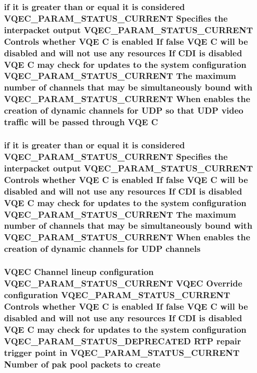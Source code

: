 \subsubsection{\setlength{\rightskip}{0pt plus 5cm}if it is greater than or equal it is considered VQEC\_\-PARAM\_\-STATUS\_\-CURRENT Specifies the interpacket output VQEC\_\-PARAM\_\-STATUS\_\-CURRENT Controls whether VQE \bf{C} is enabled If false VQE \bf{C} will be disabled and will not use any resources If CDI is disabled VQE \bf{C} may check for updates \bf{to} the system configuration VQEC\_\-PARAM\_\-STATUS\_\-CURRENT The maximum number of \bf{channels} that may be simultaneously bound with VQEC\_\-PARAM\_\-STATUS\_\-CURRENT When enables the creation of dynamic \bf{channels} for UDP so that UDP video traffic will be passed through VQE \bf{C}}\label{vqec__cfg__settings_8h_99d041f03695e88e709b5d061ad6ff0a}


\subsubsection{\setlength{\rightskip}{0pt plus 5cm}if it is greater than or equal it is considered VQEC\_\-PARAM\_\-STATUS\_\-CURRENT Specifies the interpacket output VQEC\_\-PARAM\_\-STATUS\_\-CURRENT Controls whether VQE \bf{C} is enabled If false VQE \bf{C} will be disabled and will not use any resources If CDI is disabled VQE \bf{C} may check for updates \bf{to} the system configuration VQEC\_\-PARAM\_\-STATUS\_\-CURRENT The maximum number of \bf{channels} that may be simultaneously bound with VQEC\_\-PARAM\_\-STATUS\_\-CURRENT When enables the creation of dynamic \bf{channels} for UDP \bf{channels}}\label{vqec__cfg__settings_8h_53bba5c73b1407b32cf1096eae0da5b1}


\subsubsection{\setlength{\rightskip}{0pt plus 5cm}VQEC Channel lineup configuration VQEC\_\-PARAM\_\-STATUS\_\-CURRENT VQEC Override configuration VQEC\_\-PARAM\_\-STATUS\_\-CURRENT Controls whether VQE \bf{C} is enabled If false VQE \bf{C} will be disabled and will not use any resources If CDI is disabled VQE \bf{C} may check for updates \bf{to} the system configuration VQEC\_\-PARAM\_\-STATUS\_\-DEPRECATED RTP repair trigger point in VQEC\_\-PARAM\_\-STATUS\_\-CURRENT Number of pak pool packets \bf{to} \bf{create}}\label{vqec__cfg__settings_8h_ce07ea375d7b1c22171a79282a8981fb}


